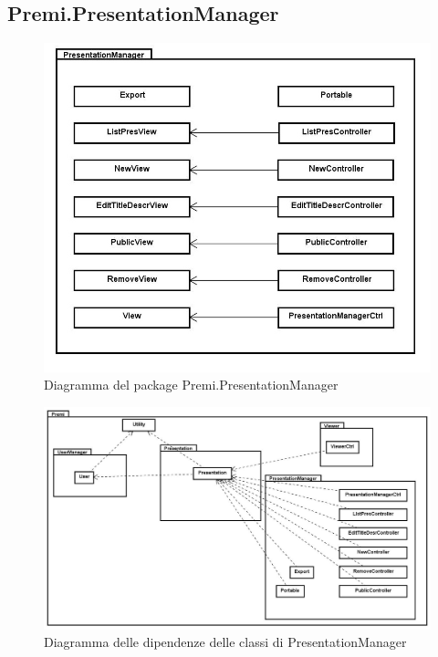 \subsection{Premi.PresentationManager}
\begin{figure}[h!]
\begin{center}
\includegraphics[scale=0.35]{img/diapkg/presentationmanager-class.jpg}
\caption{Diagramma del package Premi.PresentationManager}
\end{center}
\end{figure}
\begin{figure}[h!]
\begin{center}
\includegraphics[scale=0.35]{img/diapkg/Completo_dettagliato.jpg}
\caption{Diagramma delle dipendenze delle classi di PresentationManager}
\end{center}
\end{figure}

